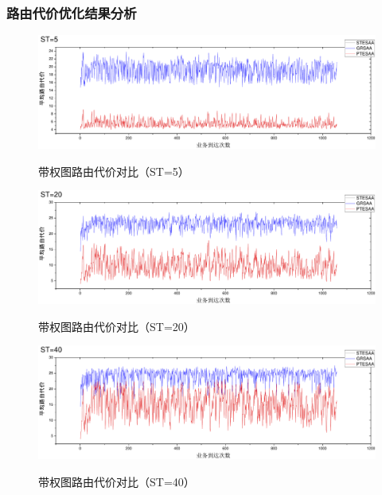 \subsubsection{路由代价优化结果分析}
\begin{figure}
\vspace{-0.5cm}
\setlength{\abovecaptionskip}{-0.5cm}
\begin{center}
{\includegraphics[width=1 \textwidth]{figures/H5C.pdf}}
\end{center}
\caption{{\footnotesize{带权图路由代价对比（ST=5）}}}
\label{H5C}
\end{figure}
\begin{figure}
\vspace{-0.5cm}
\setlength{\abovecaptionskip}{-0.5cm}
\begin{center}
{\includegraphics[width=1 \textwidth]{figures/H20C.pdf}}
\end{center}
\caption{{\footnotesize{带权图路由代价对比（ST=20）}}}
\label{H20C}
\end{figure}
\begin{figure}
\vspace{-0.5cm}
\setlength{\abovecaptionskip}{-0.5cm}
\begin{center}
{\includegraphics[width=1 \textwidth]{figures/H40C.pdf}}
\end{center}
\caption{{\footnotesize{带权图路由代价对比（ST=40）}}}
\label{H40C}
\end{figure}
